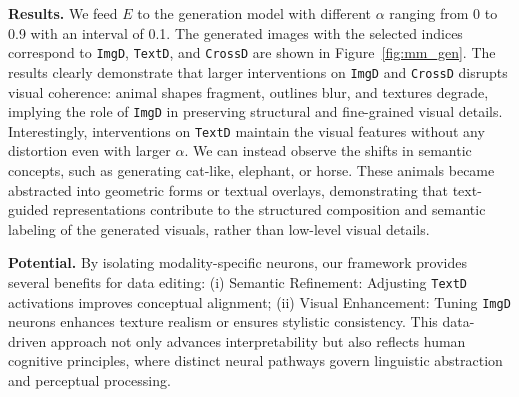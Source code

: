 \textbf{Results.} We feed $E$ to the generation model with different $\alpha$ ranging from 0 to 0.9 with an interval of 0.1. The generated images with the selected indices correspond to \texttt{ImgD}, \texttt{TextD}, and \texttt{CrossD} are shown in Figure~\ref{fig:mm_gen}. The results clearly demonstrate that larger interventions on \texttt{ImgD} and \texttt{CrossD} disrupts visual coherence: animal shapes fragment, outlines blur, and textures degrade, implying the role of \texttt{ImgD} in preserving structural and fine-grained visual details. Interestingly, interventions on \texttt{TextD} maintain the visual features without any distortion even with larger $\alpha$.  We can instead observe the shifts in semantic concepts, such as generating cat-like, elephant, or horse. These animals became abstracted into geometric forms or textual overlays, demonstrating that text-guided representations contribute to the structured composition and semantic labeling of the generated visuals, rather than low-level visual details.  

\textbf{Potential.} By isolating modality-specific neurons, our framework provides several benefits for data editing: (i) Semantic Refinement: Adjusting \texttt{TextD} activations improves conceptual alignment; (ii) Visual Enhancement: Tuning \texttt{ImgD} neurons enhances texture realism or ensures stylistic consistency. This data-driven approach not only advances interpretability but also reflects human cognitive principles, where distinct neural pathways govern linguistic abstraction and perceptual processing.


